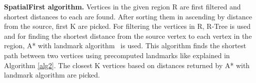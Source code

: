 \textbf{SpatialFirst algorithm. } Vertices in the given region R are first filtered and shortest distances to each are found. After sorting them in ascending by distance from the source, first K are picked. For filtering the vertices in R, R-Tree is used and for finding the shortest distance from the source vertex to each vertex in the region, A* with landmark algorithm~\cite{AC2005} is used. This algorithm finds the shortest path between two vertices using precomputed landmarks like explained in Algorithm \ref{alg2}. The closest K vertices based on distances returned by A* with landmark algorithm are picked. 




